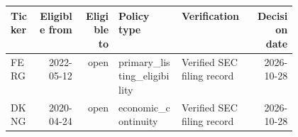 \begin{tabular}{@{}lrrp{0.22\linewidth}p{0.25\linewidth}r@{}}
\toprule
Ticker & Eligible from & Eligible to & Policy type & Verification & Decision date \\
\midrule
FERG & 2022-05-12 & open & primary\_\allowbreak{}listing\_\allowbreak{}eligibility & Verified SEC filing record & 2026-10-28 \\
DKNG & 2020-04-24 & open & economic\_\allowbreak{}continuity & Verified SEC filing record & 2026-10-28 \\
\bottomrule
\end{tabular}
